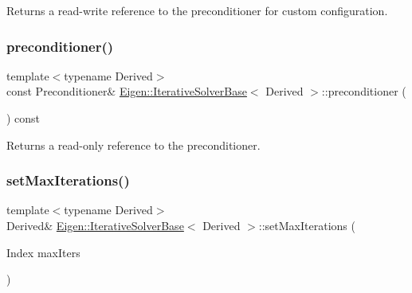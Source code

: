 \begin{DoxyReturn}{Returns}
a read-\/write reference to the preconditioner for custom configuration. 
\end{DoxyReturn}
\mbox{\label{class_eigen_1_1_iterative_solver_base_a709a056e17c49b5272e4971bc376cbe4}} 
\subsubsection{\texorpdfstring{preconditioner()}{preconditioner()}\hspace{0.1cm}{\footnotesize\ttfamily [2/2]}}
{\footnotesize\ttfamily template$<$typename Derived$>$ \\
const Preconditioner\& \mbox{\hyperlink{class_eigen_1_1_iterative_solver_base}{Eigen\+::\+Iterative\+Solver\+Base}}$<$ Derived $>$\+::preconditioner (\begin{DoxyParamCaption}{ }\end{DoxyParamCaption}) const\hspace{0.3cm}{\ttfamily [inline]}}

\begin{DoxyReturn}{Returns}
a read-\/only reference to the preconditioner. 
\end{DoxyReturn}
\mbox{\label{class_eigen_1_1_iterative_solver_base_af83de7a7d31d9d4bd1fef6222b07335b}} 
\subsubsection{\texorpdfstring{setMaxIterations()}{setMaxIterations()}}
{\footnotesize\ttfamily template$<$typename Derived$>$ \\
Derived\& \mbox{\hyperlink{class_eigen_1_1_iterative_solver_base}{Eigen\+::\+Iterative\+Solver\+Base}}$<$ Derived $>$\+::set\+Max\+Iterations (\begin{DoxyParamCaption}\item[{Index}]{max\+Iters }\end{DoxyParamCaption})\hspace{0.3cm}{\ttfamily [inline]}}

